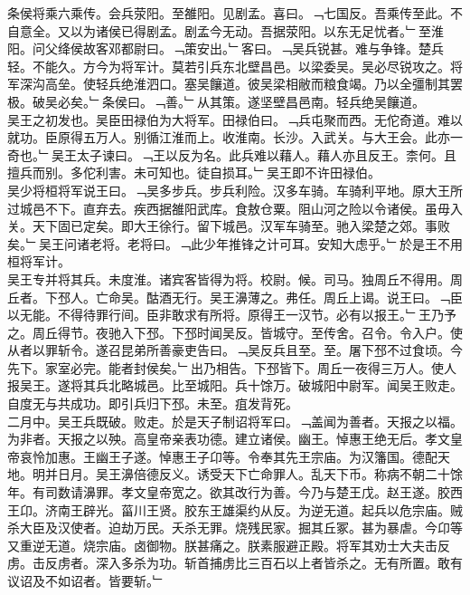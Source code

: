 \documentclass{zhvt-classic}
\begin{document}
\hspace*{2em}条侯将乘六乘传。会兵荥阳。至雒阳。见剧孟。喜曰。﹁七国反。吾乘传至此。不自意全。又以为诸侯已得剧孟。剧孟今无动。吾据荥阳。以东无足忧者。﹂至淮阳。问父绛侯故客邓都尉曰。﹁策安出。﹂客曰。﹁吴兵锐甚。难与争锋。楚兵轻。不能久。方今为将军计。莫若引兵东北壁昌邑。以梁委吴。吴必尽锐攻之。将军深沟高垒。使轻兵绝淮泗口。塞吴饟道。彼吴梁相敝而粮食竭。乃以全彊制其罢极。破吴必矣。﹂条侯曰。﹁善。﹂从其策。遂坚壁昌邑南。轻兵绝吴饟道。\\
\hspace*{2em}吴王之初发也。吴臣田禄伯为大将军。田禄伯曰。﹁兵屯聚而西。无佗奇道。难以就功。臣原得五万人。别循江淮而上。收淮南。长沙。入武关。与大王会。此亦一奇也。﹂吴王太子谏曰。﹁王以反为名。此兵难以藉人。藉人亦且反王。柰何。且擅兵而别。多佗利害。未可知也。徒自损耳。﹂吴王即不许田禄伯。\\
\hspace*{2em}吴少将桓将军说王曰。﹁吴多步兵。步兵利险。汉多车骑。车骑利平地。原大王所过城邑不下。直弃去。疾西据雒阳武库。食敖仓粟。阻山河之险以令诸侯。虽毋入关。天下固已定矣。即大王徐行。留下城邑。汉军车骑至。驰入梁楚之郊。事败矣。﹂吴王问诸老将。老将曰。﹁此少年推锋之计可耳。安知大虑乎。﹂於是王不用桓将军计。\\
\hspace*{2em}吴王专并将其兵。未度淮。诸宾客皆得为将。校尉。候。司马。独周丘不得用。周丘者。下邳人。亡命吴。酤酒无行。吴王濞薄之。弗任。周丘上谒。说王曰。﹁臣以无能。不得待罪行间。臣非敢求有所将。原得王一汉节。必有以报王。﹂王乃予之。周丘得节。夜驰入下邳。下邳时闻吴反。皆城守。至传舍。召令。令入户。使从者以罪斩令。遂召昆弟所善豪吏告曰。﹁吴反兵且至。至。屠下邳不过食顷。今先下。家室必完。能者封侯矣。﹂出乃相告。下邳皆下。周丘一夜得三万人。使人报吴王。遂将其兵北略城邑。比至城阳。兵十馀万。破城阳中尉军。闻吴王败走。自度无与共成功。即引兵归下邳。未至。疽发背死。\\
\hspace*{2em}二月中。吴王兵既破。败走。於是天子制诏将军曰。﹁盖闻为善者。天报之以福。为非者。天报之以殃。高皇帝亲表功德。建立诸侯。幽王。悼惠王绝无后。孝文皇帝哀怜加惠。王幽王子遂。悼惠王子卬等。令奉其先王宗庙。为汉籓国。德配天地。明并日月。吴王濞倍德反义。诱受天下亡命罪人。乱天下币。称病不朝二十馀年。有司数请濞罪。孝文皇帝宽之。欲其改行为善。今乃与楚王戊。赵王遂。胶西王卬。济南王辟光。菑川王贤。胶东王雄渠约从反。为逆无道。起兵以危宗庙。贼杀大臣及汉使者。迫劫万民。夭杀无罪。烧残民家。掘其丘冢。甚为暴虐。今卬等又重逆无道。烧宗庙。卤御物。朕甚痛之。朕素服避正殿。将军其劝士大夫击反虏。击反虏者。深入多杀为功。斩首捕虏比三百石以上者皆杀之。无有所置。敢有议诏及不如诏者。皆要斩。﹂\\
\end{document}
